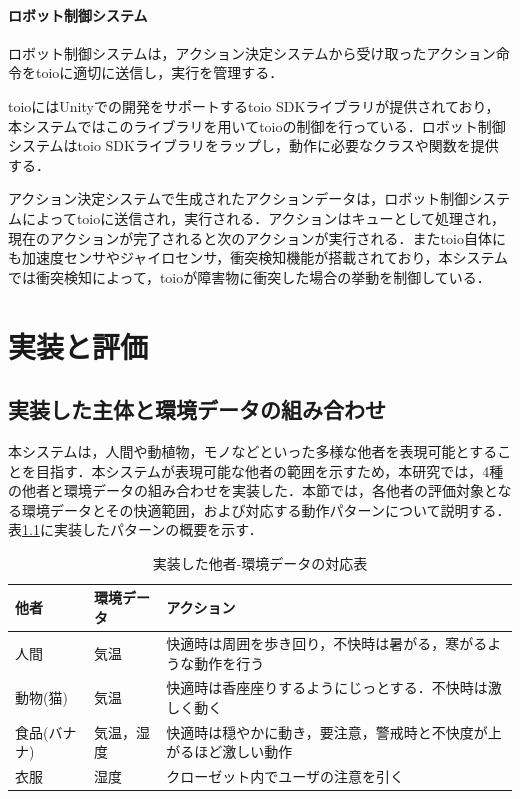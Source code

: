 \documentclass{cuxarticle}
\begin{document}
\subsubsection{ロボット制御システム}
ロボット制御システムは，アクション決定システムから受け取ったアクション命令をtoioに適切に送信し，実行を管理する．

toioにはUnityでの開発をサポートするtoio SDKライブラリが提供されており，本システムではこのライブラリを用いてtoioの制御を行っている．ロボット制御システムはtoio SDKライブラリをラップし，動作に必要なクラスや関数を提供する．

アクション決定システムで生成されたアクションデータは，ロボット制御システムによってtoioに送信され，実行される．アクションはキューとして処理され，現在のアクションが完了されると次のアクションが実行される．またtoio自体にも加速度センサやジャイロセンサ，衝突検知機能が搭載されており，本システムでは衝突検知によって，toioが障害物に衝突した場合の挙動を制御している．

\chapter{実装と評価}

\section{実装した主体と環境データの組み合わせ}
本システムは，人間や動植物，モノなどといった多様な他者を表現可能とすることを目指す．本システムが表現可能な他者の範囲を示すため，本研究では，4種の他者と環境データの組み合わせを実装した．本節では，各他者の評価対象となる環境データとその快適範囲，および対応する動作パターンについて説明する．表\ref{table:entities}に実装したパターンの概要を示す．

\begin{table}[htbp]
  \caption{実装した他者-環境データの対応表}
  \label{table:entities}
  \centering
  \begin{tabular}{|l|l|l|}
    \hline
    他者 & 環境データ & アクション \\
    \hline
    人間 & 気温 &  快適時は周囲を歩き回り，不快時は暑がる，寒がるような動作を行う \\
    \hline
    動物(猫) & 気温 & 快適時は香座座りするようにじっとする．不快時は激しく動く \\
    \hline
    食品(バナナ) & 気温，湿度 & 快適時は穏やかに動き，要注意，警戒時と不快度が上がるほど激しい動作 \\
    \hline
    衣服 & 湿度 & クローゼット内でユーザの注意を引く \\
    \hline
  \end{tabular}
\end{table}
\end{document}
